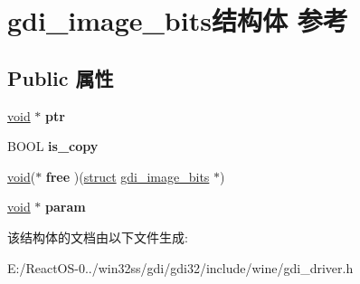 \hypertarget{structgdi__image__bits}{}\section{gdi\+\_\+image\+\_\+bits结构体 参考}
\label{structgdi__image__bits}
\subsection*{Public 属性}
\begin{DoxyCompactItemize}
\item 
\mbox{\label{structgdi__image__bits_aa33d605a4bf639c57a0bfe4ca0fec8e1}} 
\hyperlink{interfacevoid}{void} $\ast$ {\bfseries ptr}
\item 
\mbox{\label{structgdi__image__bits_a5a206ac5f44757de9e716d60fc9f5aec}} 
B\+O\+OL {\bfseries is\+\_\+copy}
\item 
\mbox{\label{structgdi__image__bits_a6441db6a791aca38d00f81dde1f36da4}} 
\hyperlink{interfacevoid}{void}($\ast$ {\bfseries free} )(\hyperlink{interfacestruct}{struct} \hyperlink{structgdi__image__bits}{gdi\+\_\+image\+\_\+bits} $\ast$)
\item 
\mbox{\label{structgdi__image__bits_a08e97289959dc174a346b29260a088d2}} 
\hyperlink{interfacevoid}{void} $\ast$ {\bfseries param}
\end{DoxyCompactItemize}


该结构体的文档由以下文件生成\+:\begin{DoxyCompactItemize}
\item 
E\+:/\+React\+O\+S-\/0../win32ss/gdi/gdi32/include/wine/gdi\+\_\+driver.\+h\end{DoxyCompactItemize}
